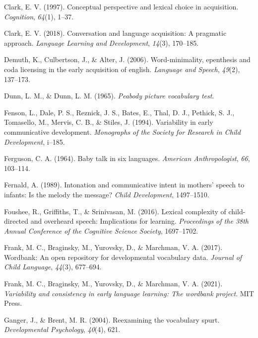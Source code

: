 \documentclass[10pt, letterpaper]{article}
\newenvironment{CSLReferences}%
  {}%
  {\par}
\begin{document}
\begin{CSLReferences}
\leavevmode\hypertarget{ref-clark1997conceptual}{}%
Clark, E. V. (1997). Conceptual perspective and lexical choice in
acquisition. \emph{Cognition}, \emph{64}(1), 1--37.

\leavevmode\hypertarget{ref-clark2018conversation}{}%
Clark, E. V. (2018). Conversation and language acquisition: A pragmatic
approach. \emph{Language Learning and Development}, \emph{14}(3),
170--185.

\leavevmode\hypertarget{ref-demuth2006word}{}%
Demuth, K., Culbertson, J., \& Alter, J. (2006). Word-minimality,
epenthesis and coda licensing in the early acquisition of english.
\emph{Language and Speech}, \emph{49}(2), 137--173.

\leavevmode\hypertarget{ref-dunn1965peabody}{}%
Dunn, L. M., \& Dunn, L. M. (1965). \emph{Peabody picture vocabulary
test}.

\leavevmode\hypertarget{ref-fenson1994variability}{}%
Fenson, L., Dale, P. S., Reznick, J. S., Bates, E., Thal, D. J.,
Pethick, S. J., Tomasello, M., Mervis, C. B., \& Stiles, J. (1994).
Variability in early communicative development. \emph{Monographs of the
Society for Research in Child Development}, i--185.

\leavevmode\hypertarget{ref-ferguson1964baby}{}%
Ferguson, C. A. (1964). Baby talk in six languages. \emph{American
Anthropologist}, \emph{66}, 103--114.

\leavevmode\hypertarget{ref-fernald1989intonation}{}%
Fernald, A. (1989). Intonation and communicative intent in mothers'
speech to infants: Is the melody the message? \emph{Child Development},
1497--1510.

\leavevmode\hypertarget{ref-foushee2016lexical}{}%
Foushee, R., Griffiths, T., \& Srinivasan, M. (2016). Lexical complexity
of child-directed and overheard speech: Implications for learning.
\emph{Proceedings of the 38th Annual Conference of the Cognitive Science
Society}, 1697--1702.

\leavevmode\hypertarget{ref-frank2017wordbank}{}%
Frank, M. C., Braginsky, M., Yurovsky, D., \& Marchman, V. A. (2017).
Wordbank: An open repository for developmental vocabulary data.
\emph{Journal of Child Language}, \emph{44}(3), 677--694.

\leavevmode\hypertarget{ref-frank2021variability}{}%
Frank, M. C., Braginsky, M., Yurovsky, D., \& Marchman, V. A. (2021).
\emph{Variability and consistency in early language learning: The
wordbank project}. MIT Press.

\leavevmode\hypertarget{ref-ganger2004reexamining}{}%
Ganger, J., \& Brent, M. R. (2004). Reexamining the vocabulary spurt.
\emph{Developmental Psychology}, \emph{40}(4), 621.


\end{CSLReferences}
\end{document}
